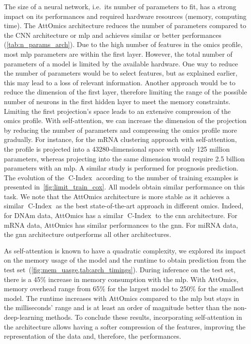 \documentclass[../main.tex]{subfiles}
\begin{document}
		The size of a neural network, i.e.\ its number of parameters to fit, has a strong impact on its performances and required hardware resources (memory, computing time).
		The AttOmics architecture reduces the number of parameters compared to the CNN architecture or \gls{mlp} and achieves similar or better performances (\cref{tab:n_params_arch}).
		Due to the high number of features in the omics profile, most \gls{mlp} parameters are within the first layer.
		However, the total number of parameters of a model is limited by the available hardware.
		One way to reduce the number of parameters would be to select features, but as explained earlier, this may lead to a loss of relevant information.
		Another approach would be to reduce the dimension of the first layer, therefore limiting the range of the possible number of neurons in the first hidden layer to meet the memory constraints.
		Limiting the first projection's space leads to an extensive compression of the omics profile.
		With self-attention, we can increase the dimension of the projection by reducing the number of parameters and compressing the omics profile more gradually.
		For instance, for the mRNA clustering approach with self-attention, the profile is projected into a 43280-dimensional space with only 125 million parameters, whereas projecting into the same dimension would require 2.5 billion parameters with an \gls{mlp}.
		A similar study is performed for prognosis prediction.
		The evolution of the \(\operatorname{C-Index}\) according to the number of training examples is presented in~\cref{fig:limit_train_cox}.
		All models obtain similar performance on this task.
		We note that the AttOmics architecture is more stable as it achieves a similar \(\operatorname{C-Index}\) as the best state-of-the-art approach in different omics.
		Indeed, for DNAm data, AttOmics has a similar \(\operatorname{C-Index}\) to the \gls{cnn} architecture. For mRNA data, AttOmics has similar performances to the \gls{gnn}.
		For miRNA data, the \gls{gnn} architecture outperforms all other architectures.

		As self-attention is known to have a quadratic complexity, we explored its impact on the memory usage of the model and the runtime to obtain prediction from the test set~(\cref{fig:mem_uasge,tab:arch_timings}).
		During inference on the test set, there is a 45\% increase in memory consumption with the \gls{mlp}.
		With AttOmics, memory overhead range from 65\% for the largest model to 250\% for the smallest model.
		The runtime increases with AttOmics compared to the \gls{mlp} but stays in the milliseconds' range and is at least an order of magnitude better than the non-deep-learning methods.
		To conclude these results, incorporating self-attention in the architecture allows having a softer compression of the features, improving the representation of the data and, therefore, the performances.
\end{document}
